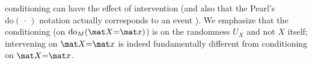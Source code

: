 conditioning can have the effect of intervention
    (and also that the Pearl's $\mathrm{do}(\,\cdot\,)$ notation actually corresponds to an event \citep{sep-causal-models}). 
We emphasize that the conditioning (on $\mathrm{do}_M(\mat X{=}\mat x)$) is on the randomness $U_X$ and not $X$ itself; 
intervening on $\mat X{=}\mat x$ is indeed fundamentally different
from conditioning on $\mat X{=}\mat x$.
%
% 
